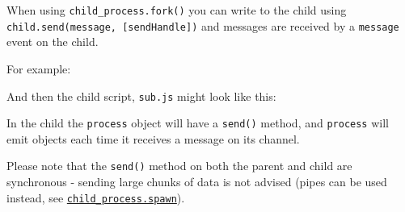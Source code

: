 When using \texttt{child\_process.fork()} you can write to the child
using \texttt{child.send(message,\ {[}sendHandle{]})} and messages are
received by a \texttt{\textquotesingle{}message\textquotesingle{}} event
on the child.

For example:

\begin{Shaded}
\begin{Highlighting}[]
 \NormalTok{(}\NormalTok{);}

 \NormalTok{);}

\NormalTok{(}\NormalTok{, }
  \NormalTok{(}
\NormalTok{\});}

\NormalTok{(\{ }\NormalTok{: } \NormalTok{\});}
\end{Highlighting}
\end{Shaded}

And then the child script,
\texttt{\textquotesingle{}sub.js\textquotesingle{}} might look like
this:

\begin{Shaded}
\begin{Highlighting}[]
\NormalTok{(}\NormalTok{, }
  \NormalTok{(}
\NormalTok{\});}

\NormalTok{(\{ }\NormalTok{: } \NormalTok{\});}
\end{Highlighting}
\end{Shaded}

In the child the \texttt{process} object will have a \texttt{send()}
method, and \texttt{process} will emit objects each time it receives a
message on its channel.

Please note that the \texttt{send()} method on both the parent and child
are synchronous - sending large chunks of data is not advised (pipes can
be used instead, see
\hyperref[childux5fprocessux5fchildux5fprocessux5fspawnux5fcommandux5fargsux5foptions]{\texttt{child\_process.spawn}}).

